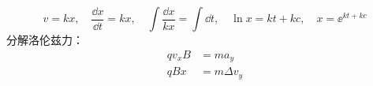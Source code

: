 \[
v=kx,\quad \frac{\dd x}{\dd t}=kx,\quad \int\frac{\dd x}{kx}=\int\dd t,\quad \ln x=kt+kc,\quad x=\ee^{kt+kc}
\]
分解洛伦兹力：
\begin{align*}
qv_xB &= ma_y\\
qBx &= m\Delta v_y %
\end{align*}

